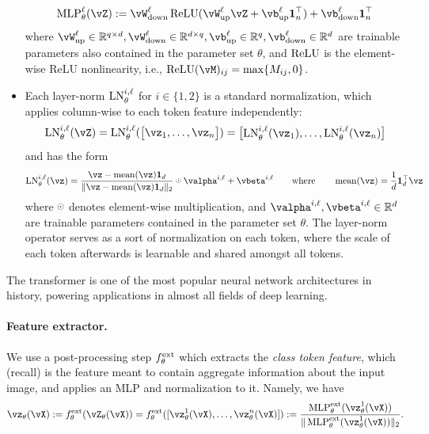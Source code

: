 \documentclass[../../book-main.tex]{subfiles}
\begin{document}
\begin{itemize}
    \begin{equation}
        \MLP_{\theta}^{\ell}(\vZ) := \vW_{\down}^{\ell}\ReLU(\vW_{\up}^{\ell}\vZ + \vb_{\up}^{\ell}\vone_{n}^{\top}) + \vb_{\down}^{\ell}\vone_{n}^{\top}
    \end{equation}
    where \(\vW_{\up}^{\ell} \in \R^{q \times d}, \vW_{\down}^{\ell} \in \R^{d \times q}, \vb_{\up}^{\ell} \in \R^{q}, \vb_{\down}^{\ell} \in \R^{d}\) are trainable parameters also contained in the parameter set \(\theta\), and \(\operatorname{ReLU}\) is the element-wise ReLU nonlinearity, i.e., \(\ReLU(\vM)_{ij} = \max\{M_{ij}, 0\}\). 
    \item Each layer-norm \(\operatorname{LN}_{\theta}^{i, \ell}\) for \(i \in \{1, 2\}\) is a standard normalization, which applies column-wise to each token feature independently:
    \begin{equation}
        \LN_{\theta}^{i, \ell}(\vZ) = \LN_{\theta}^{i, \ell}(\mat{\vz_{1}, \dots, \vz_{n}}) = \mat{\LN_{\theta}^{i, \ell}(\vz_{1}), \dots, \LN_{\theta}^{i, \ell}(\vz_{n})}
    \end{equation}
    and has the form 
    \begin{equation}
        \LN_{\theta}^{i, \ell}(\vz) = \frac{\vz
        - \operatorname{mean}(\vz)\vone_{d}}{\norm{\vz
        - \operatorname{mean}(\vz)\vone_{d}}_{2}} \hada \valpha^{i, \ell} + \vbeta^{i, \ell} \qquad \text{where} \qquad \operatorname{mean}(\vz) = \frac{1}{d}\vone_{d}^{\top}\vz
    \end{equation}
    where \(\hada\) denotes element-wise multiplication, and \(\valpha^{i, \ell}, \vbeta^{i, \ell} \in \R^{d}\) are trainable parameters contained in the parameter set \(\theta\). The layer-norm operator serves as a sort of normalization on each token, where the scale of each token afterwards is learnable and shared amongst all tokens. 
\end{itemize}

The transformer is one of the most popular neural network architectures in history, powering applications in almost all fields of deep learning. 

\paragraph{Feature extractor.} We use a post-processing step \(f_{\theta}^{\mathrm{ext}}\) which extracts the \textit{class token feature}, which (recall) is the feature meant to contain aggregate information about the input image, and applies an MLP and normalization to it. Namely, we have 
\begin{equation}
    \vz_{\theta}(\vX) := f_{\theta}^{\ext}(\vZ_{\theta}(\vX)) = f_{\theta}^{\ext}([\vz_{\theta}^{1}(\vX), \dots, \vz_{\theta}^{n}(\vX)]) := \frac{\MLP_{\theta}^{\ext}(\vz_{\theta}^{1}(\vX))}{\norm{\MLP_{\theta}^{\ext}(\vz_{\theta}^{1}(\vX))}_{2}}.
\end{equation} 
\end{document}
